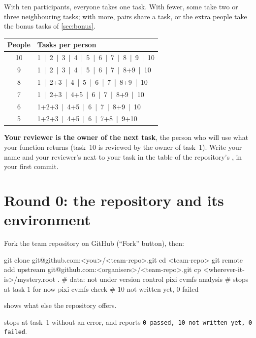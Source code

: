 With ten participants, everyone takes one task. With fewer, some take two or
three neighbouring tasks; with more, pairs share a task, or the extra people
take the bonus tasks of \cref{sec:bonus}.

\begin{center}\small
\begin{tabular}{c l}
\toprule
People & Tasks per person \\
\midrule
10 & 1 \,|\, 2 \,|\, 3 \,|\, 4 \,|\, 5 \,|\, 6 \,|\, 7 \,|\, 8 \,|\, 9 \,|\, 10 \\
9  & 1 \,|\, 2 \,|\, 3 \,|\, 4 \,|\, 5 \,|\, 6 \,|\, 7 \,|\, 8+9 \,|\, 10 \\
8  & 1 \,|\, 2+3 \,|\, 4 \,|\, 5 \,|\, 6 \,|\, 7 \,|\, 8+9 \,|\, 10 \\
7  & 1 \,|\, 2+3 \,|\, 4+5 \,|\, 6 \,|\, 7 \,|\, 8+9 \,|\, 10 \\
6  & 1+2+3 \,|\, 4+5 \,|\, 6 \,|\, 7 \,|\, 8+9 \,|\, 10 \\
5  & 1+2+3 \,|\, 4+5 \,|\, 6 \,|\, 7+8 \,|\, 9+10 \\
\bottomrule
\end{tabular}
\end{center}

\textbf{Your reviewer is the owner of the next task}, the person who will use
what your function returns (task~10 is reviewed by the owner of task~1).
Write your name and your reviewer's next to your task in the table of the
repository's , in your first commit.

\section{Round 0: the repository and its environment}
\label{sec:teamworkflow}

Fork the team repository on GitHub (``Fork'' button), then:
\begin{shell}
git clone git@github.com:<you>/<team-repo>.git
cd <team-repo>
git remote add upstream git@github.com:<organisers>/<team-repo>.git
cp <wherever-it-is>/mystery.root .          # data: not under version control
pixi cvmfs analysis                         # stops at task 1 for now
pixi cvmfs check                            # 10 not written yet, 0 failed
\end{shell}
 shows what else the repository offers.

\begin{checkpoint}
 stops at task~1 without an error, and
 reports \texttt{0 passed, 10 not written yet, 0 failed}.
\end{checkpoint}

